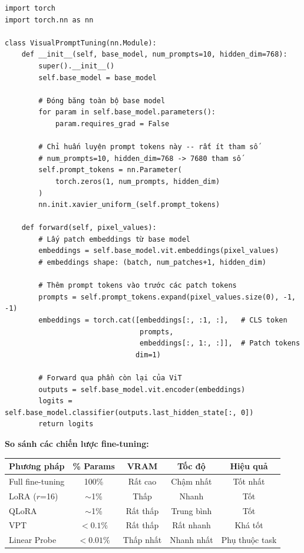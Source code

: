 \begin{verbatim}
import torch
import torch.nn as nn

class VisualPromptTuning(nn.Module):
    def __init__(self, base_model, num_prompts=10, hidden_dim=768):
        super().__init__()
        self.base_model = base_model

        # Đóng băng toàn bộ base model
        for param in self.base_model.parameters():
            param.requires_grad = False

        # Chỉ huấn luyện prompt tokens này -- rất ít tham số
        # num_prompts=10, hidden_dim=768 -> 7680 tham số
        self.prompt_tokens = nn.Parameter(
            torch.zeros(1, num_prompts, hidden_dim)
        )
        nn.init.xavier_uniform_(self.prompt_tokens)

    def forward(self, pixel_values):
        # Lấy patch embeddings từ base model
        embeddings = self.base_model.vit.embeddings(pixel_values)
        # embeddings shape: (batch, num_patches+1, hidden_dim)

        # Thêm prompt tokens vào trước các patch tokens
        prompts = self.prompt_tokens.expand(pixel_values.size(0), -1, -1)
        embeddings = torch.cat([embeddings[:, :1, :],   # CLS token
                                prompts,
                                embeddings[:, 1:, :]],  # Patch tokens
                               dim=1)

        # Forward qua phần còn lại của ViT
        outputs = self.base_model.vit.encoder(embeddings)
        logits = self.base_model.classifier(outputs.last_hidden_state[:, 0])
        return logits
\end{verbatim}

\vspace{0.5em}
\textbf{So sánh các chiến lược fine-tuning:}

\begin{center}
\begin{tabular}{lcccc}
\hline
\textbf{Phương pháp} & \textbf{\% Params} & \textbf{VRAM} & \textbf{Tốc độ} & \textbf{Hiệu quả} \\
\hline
Full fine-tuning  & 100\%    & Rất cao   & Chậm nhất  & Tốt nhất \\
LoRA ($r$=16)    & $\sim$1\%  & Thấp      & Nhanh      & Tốt \\
QLoRA            & $\sim$1\%  & Rất thấp  & Trung bình & Tốt \\
VPT              & $<0.1\%$  & Rất thấp  & Rất nhanh  & Khá tốt \\
Linear Probe     & $<0.01\%$ & Thấp nhất & Nhanh nhất & Phụ thuộc task \\
\hline
\end{tabular}
\end{center}

